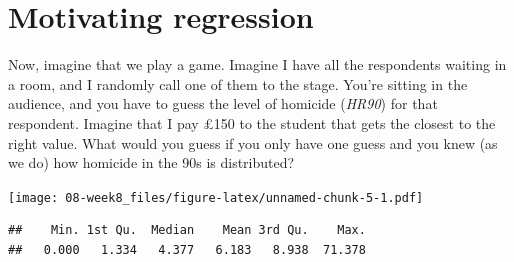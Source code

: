 \documentclass[]{book}
\newenvironment{Shaded}{\begin{snugshade}}{\end{snugshade}}
\newcommand{\CommentTok}[1]{\textcolor[rgb]{0.56,0.35,0.01}{\textit{#1}}}
\newcommand{\DataTypeTok}[1]{\textcolor[rgb]{0.13,0.29,0.53}{#1}}
\newcommand{\DecValTok}[1]{\textcolor[rgb]{0.00,0.00,0.81}{#1}}
\newcommand{\KeywordTok}[1]{\textcolor[rgb]{0.13,0.29,0.53}{\textbf{#1}}}
\newcommand{\NormalTok}[1]{#1}
\newcommand{\OperatorTok}[1]{\textcolor[rgb]{0.81,0.36,0.00}{\textbf{#1}}}
\newcommand{\StringTok}[1]{\textcolor[rgb]{0.31,0.60,0.02}{#1}}
\begin{document}
\hypertarget{motivating-regression}{%
\section{Motivating regression}\label{motivating-regression}}

Now, imagine that we play a game. Imagine I have all the respondents waiting in a room, and I randomly call one of them to the stage. You're sitting in the audience, and you have to guess the level of homicide (\emph{HR90}) for that respondent. Imagine that I pay £150 to the student that gets the closest to the right value. What would you guess if you only have one guess and you knew (as we do) how homicide in the 90s is distributed?

\begin{Shaded}
\end{Shaded}

\texttt{[image: 08-week8\_files/figure-latex/unnamed-chunk-5-1.pdf]}

\begin{Shaded}
\end{Shaded}

\begin{verbatim}
##    Min. 1st Qu.  Median    Mean 3rd Qu.    Max. 
##   0.000   1.334   4.377   6.183   8.938  71.378
\end{verbatim}
\end{document}

